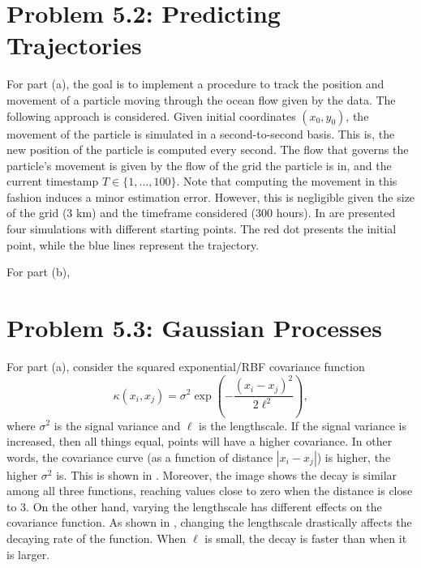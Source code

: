 \documentclass[11pt, english]{article}
\begin{document}
\begin{multicols}{2}
\section*{Problem 5.2: Predicting Trajectories}

For part (a), the goal is to implement a procedure to track the position and movement of a particle moving through the ocean flow given by the data. The following approach is considered. Given initial coordinates $(x_0, y_0)$, the movement of the particle is simulated in a second-to-second basis. This is, the new position of the particle is computed every second. The flow that governs the particle's movement is given by the flow of the grid the particle is in, and the current timestamp $T \in \{1, \ldots, 100\}$. Note that computing the movement in this fashion induces a minor estimation error. However, this is negligible given the size of the grid (3 km) and the timeframe considered (300 hours). In  are presented four simulations with different starting points. The red dot presents the initial point, while the blue lines represent the trajectory.

For part (b),


\section*{Problem 5.3: Gaussian Processes}

For part (a), consider the squared exponential/RBF covariance function
	$$\kappa(x_{i}, x_{j}) = \sigma^{2}\exp\left(-\frac{(x_{i} - x_{j})^{2}}{2\ell^{2}}\right),$$
where $\sigma^2$ is the signal variance and $\ell$ is the lengthscale. If the signal variance is increased, then all things equal, points will have a higher covariance. In other words, the covariance curve (as a function of distance $|x_{i} - x_{j}|$) is higher, the higher $\sigma^{2}$ is. This is shown in . Moreover, the image shows the decay is similar among all three functions, reaching values close to zero when the distance is close to 3. On the other hand, varying the lengthscale has different effects on the covariance function. As shown in , changing the lengthscale drastically affects the decaying rate of the function. When $\ell$ is small, the decay is faster than when it is larger.


\end{multicols}
\end{document}
